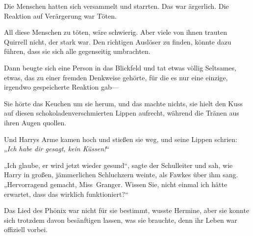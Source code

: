 Die Menschen hatten sich versammelt und starrten. Das war ärgerlich. Die Reaktion auf Verärgerung war Töten.

All diese Menschen zu töten, wäre schwierig. Aber viele von ihnen trauten Quirrell nicht, der stark war. Den richtigen Auslöser zu finden, könnte dazu führen, dass sie sich alle gegenseitig umbrachten.

Dann beugte sich eine Person in das Blickfeld und tat etwas völlig Seltsames, etwas, das zu einer fremden Denkweise gehörte, für die es nur eine einzige, irgendwo gespeicherte Reaktion gab—

\later

Sie hörte das Keuchen um sie herum, und das machte nichts, sie hielt den Kuss auf diesen schokoladenverschmierten Lippen aufrecht, während die Tränen aus ihren Augen quollen.

Und Harrys Arme kamen hoch und stießen sie weg, und seine Lippen schrien: „\emph{Ich habe dir gesagt, kein Küssen!}“

\later

„Ich glaube, er wird jetzt wieder gesund“, sagte der Schulleiter und sah, wie Harry in großen, jämmerlichen Schluchzern weinte, als Fawkes über ihm sang. „Hervorragend gemacht, Miss~Granger. Wissen Sie, nicht einmal ich hätte erwartet, dass das wirklich funktioniert?“

Das Lied des Phönix war nicht für sie bestimmt, wusste Hermine, aber sie konnte sich trotzdem davon besänftigen lassen, was sie brauchte, denn ihr Leben war offiziell vorbei.

